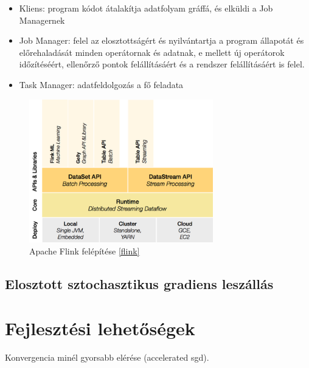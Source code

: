 \documentclass[a4paper,12pt]{article}
\begin{document}
\begin{itemize}
\item Kliens: program kódot átalakítja adatfolyam gráffá, és elküldi a Job Managernek
\item Job Manager: felel az elosztottságért és nyilvántartja a program állapotát és előrehaladását minden operátornak és adatnak, e mellett új operátorok időzítéséért, ellenőrző pontok felállításáért és a rendszer felállításáért is felel.
\item Task Manager: adatfeldolgozás a fő feladata
\end{itemize}

\begin{figure}[H]
\centering
\includegraphics[width=80mm]{img/flink.png}
\caption{Apache Flink felépítése \ref{flink} \label{apache_flink}}
\end{figure}

\subsection{Elosztott sztochasztikus gradiens leszállás}

\section{Fejlesztési lehetőségek}

Konvergencia minél gyorsabb elérése (accelerated sgd). 

\end{document}
